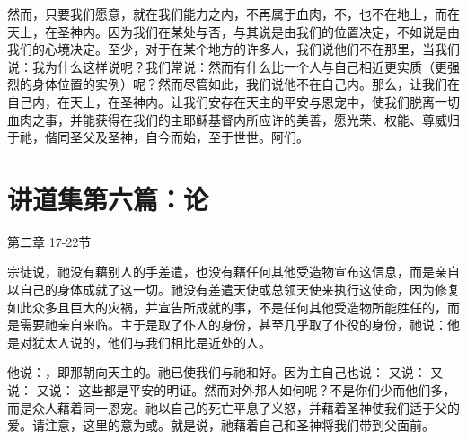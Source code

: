 然而，只要我们愿意，就在我们能力之内，不再属于血肉，不，也不在地上，而在天上，在圣神内。因为我们在某处与否，与其说是由我们的位置决定，不如说是由我们的心境决定。至少，对于在某个地方的许多人，我们说他们不在那里，当我们说：我为什么这样说呢？我们常说：然而有什么比一个人与自己相近更实质（更强烈的身体位置的实例）呢？然而尽管如此，我们说他不在自己内。那么，让我们在自己内，在天上，在圣神内。让我们安存在天主的平安与恩宠中，使我们脱离一切血肉之事，并能获得在我们的主耶稣基督内所应许的美善，愿光荣、权能、尊威归于祂，偕同圣父及圣神，自今而始，至于世世。阿们。\par



\section{讲道集第六篇：论}

第二章 17-22节 \par

\par

宗徒说，祂没有藉别人的手差遣，也没有藉任何其他受造物宣布这信息，而是亲自以自己的身体成就了这一切。祂没有差遣天使或总领天使来执行这使命，因为修复如此众多且巨大的灾祸，并宣告所成就的事，不是任何其他受造物所能胜任的，而是需要祂亲自来临。主于是取了仆人的身份，甚至几乎取了仆役的身份，祂说：他是对犹太人说的，他们与我们相比是近处的人。\par

他说：，即那朝向天主的。祂已使我们与祂和好。因为主自己也说： 又说： 又说： 又说： 这些都是平安的明证。然而对外邦人如何呢？不是你们少而他们多，而是众人藉着同一恩宠。祂以自己的死亡平息了义怒，并藉着圣神使我们适于父的爱。请注意，这里的意为或。就是说，祂藉着自己和圣神将我们带到父面前。\par

